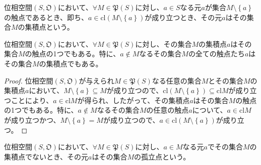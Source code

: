 \documentclass[dvipdfmx]{jsarticle}
\begin{document}
\begin{dfn}
位相空間$\left( S,\mathfrak{O} \right)$において、$\forall M \in \mathfrak{P}(S)$に対し、$a \in S$なる元$a$が集合$M \setminus \left\{ a \right\}$の触点であるとき、即ち、$a \in {\mathrm{cl}}\left( M \setminus \left\{ a \right\} \right)$が成り立つとき、その元$a$はその集合$M$の集積点という。
\end{dfn}
\begin{thm}\label{8.1.1.21}
位相空間$\left( S,\mathfrak{O} \right)$において、$\forall M \in \mathfrak{P}(S)$に対し、その集合$M$の集積点$a$はその集合$M$の触点の1つでもある。特に、$a \notin M$なるその集合$M$の全ての触点たち$a$はその集合$M$の集積点でもある。
\end{thm}
\begin{proof}
位相空間$\left( S,\mathfrak{O} \right)$が与えられ$M \in \mathfrak{P}(S)$なる任意の集合$M$とその集合$M$の集積点$a$において、$M \setminus \left\{ a \right\} \subseteq M$が成り立つので、${\mathrm{cl}}\left( M \setminus \left\{ a \right\} \right) \subseteq {\mathrm{cl}}M$が成り立つことにより、$a \in {\mathrm{cl}}M$が得られ、したがって、その集積点$a$はその集合$M$の触点の1つでもある。特に、$a \notin M$なるその集合$M$の任意の触点$a$について、$a \in {\mathrm{cl}}M$が成り立つかつ、$M \setminus \left\{ a \right\} = M$が成り立つので、$a \in {\mathrm{cl}}\left( M \setminus \left\{ a \right\} \right)$が成り立つ。
\end{proof}
\begin{dfn}
位相空間$\left( S,\mathfrak{O} \right)$において、$\forall M \in \mathfrak{P}(S)$に対し、$a \in M$なる元$a$でその集合$M$の集積点でないとき、その元$a$はその集合$M$の孤立点という。
\end{dfn}
\end{document}
